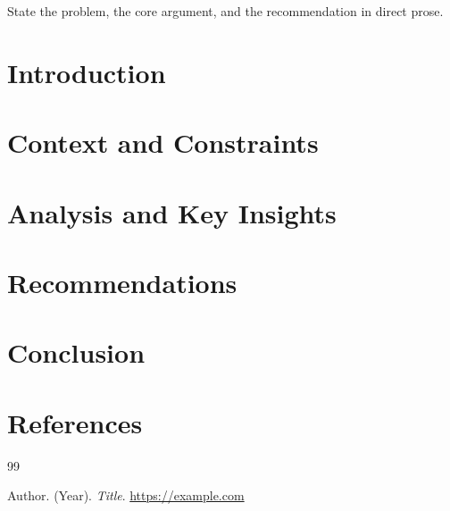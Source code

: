 \documentclass[11pt]{article}
\begin{document}
\makepapercover

{\small\renewcommand{\baselinestretch}{0.96}\selectfont\tableofcontents}
\newpage

\begin{execsummary}
State the problem, the core argument, and the recommendation in direct prose.
\end{execsummary}

\section{Introduction}

\section{Context and Constraints}

\section{Analysis and Key Insights}

\section{Recommendations}

\section{Conclusion}

\section{References}
\begin{thebibliography}{99}

  Author. (Year). \textit{Title}. \url{https://example.com}

\end{thebibliography}
\end{document}
